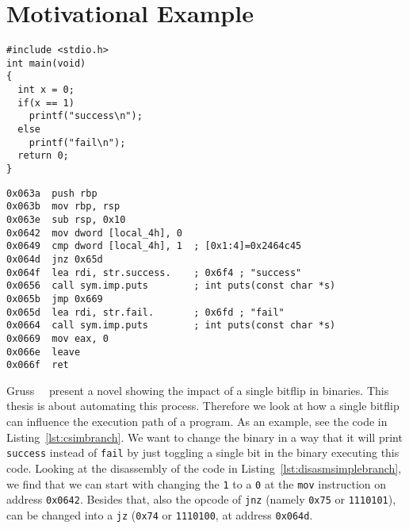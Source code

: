 \section{Motivational Example}

\begin{minipage}{\linewidth}
\begin{lstlisting}[style=CStyle,
                   caption={Simple branching code to illustrate how a single
bitflip can change the execution path.},
                   label={lst:csimbranch}]
#include <stdio.h>
int main(void)
{
  int x = 0;
  if(x == 1)
    printf("success\n");
  else
    printf("fail\n");
  return 0;
}
\end{lstlisting}
\end{minipage}

\begin{minipage}{\linewidth}
\begin{lstlisting}[style=nasm,
                   caption={Disassemby of the main function created by the
code in Listing~\ref{lst:csimbranch}. Shows disassembly at the given address
range inside the ELF file, starting at \texttt{0x063a}.},
                   label={lst:disasmsimplebranch}]
0x063a  push rbp
0x063b  mov rbp, rsp
0x063e  sub rsp, 0x10
0x0642  mov dword [local_4h], 0
0x0649  cmp dword [local_4h], 1  ; [0x1:4]=0x2464c45
0x064d  jnz 0x65d
0x064f  lea rdi, str.success.    ; 0x6f4 ; "success"
0x0656  call sym.imp.puts        ; int puts(const char *s)
0x065b  jmp 0x669
0x065d  lea rdi, str.fail.       ; 0x6fd ; "fail"
0x0664  call sym.imp.puts        ; int puts(const char *s)
0x0669  mov eax, 0
0x066e  leave
0x066f  ret
\end{lstlisting}
\end{minipage}

Gruss~\etal~\cite{flipinthewall} present a novel showing the impact of a single
bitflip in binaries. This thesis is about automating this process. Therefore we
look at how a single bitflip can influence the execution path of a program. As
an example, see the code in Listing~\ref{lst:csimbranch}. We want to change the
binary in a way that it will print \texttt{success} instead of \texttt{fail} by
just toggling a single bit in the binary executing this code. Looking at the
disassembly of the code in Listing~\ref{lst:disasmsimplebranch}, we find that we
can start with changing the \texttt{1} to a \texttt{0} at the \texttt{mov}
instruction on address \texttt{0x0642}. Besides that, also the opcode of
\texttt{jnz} (namely \texttt{0x75}  or \texttt{1110101}), can be changed into a
\texttt{jz} (\texttt{0x74} or \texttt{1110100}, at address \texttt{0x064d}.

